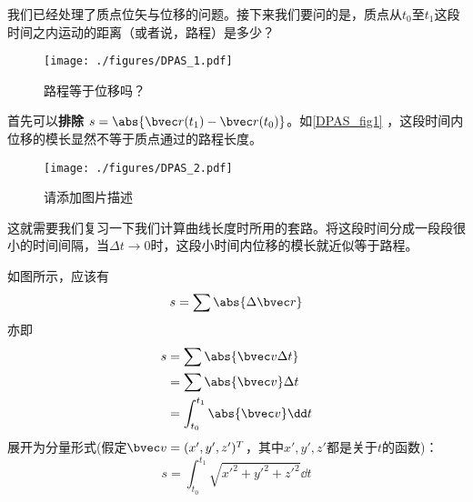 
我们已经处理了质点位矢与位移的问题。接下来我们要问的是，质点从$t_0$至$t_1$这段时间之内运动的距离（或者说，路程）是多少？

\begin{figure}[ht]
\centering
\texttt{[image: ./figures/DPAS\_1.pdf]}
\caption{路程等于位移吗？} \label{DPAS_fig1}
\end{figure}

首先可以\textbf{排除} $s = \abs{\bvec r(t_1) - \bvec r(t_0)}  $。如\autoref{DPAS_fig1} ，这段时间内位移的模长显然不等于质点通过的路程长度。

\begin{figure}[ht]
\centering
\texttt{[image: ./figures/DPAS\_2.pdf]}
\caption{请添加图片描述} \label{DPAS_fig2}
\end{figure}

这就需要我们复习一下我们计算曲线长度时所用的套路。将这段时间分成一段段很小的时间间隔，当$\Delta t \to 0$时，这段小时间内位移的模长就近似等于路程。

如图所示，应该有$$s=\sum \abs{\Delta \bvec r}$$
亦即$$
\begin{aligned}
s&=\sum \abs{\bvec v \Delta t}\\
&=\sum \abs{\bvec v} \Delta t\\
&=\int _{t_0}^{t_1} \abs{\bvec v} \dd t\\
\end{aligned}
$$
展开为分量形式(假定$\bvec v = (x',y',z')^T$，其中$x',y',z'$都是关于$t$的函数)：
$$
s = \int _{t_0}^{t_1} \sqrt{x'^2+y'^2+z'^2} \dd t
$$
